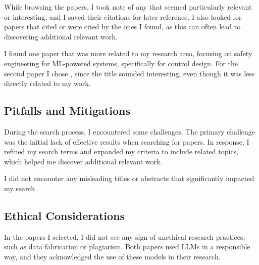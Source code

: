 \documentclass[a4paper,11pt]{article}
\begin{document}
While browsing the papers, I took note of any that seemed particularly relevant or interesting, and I saved their citations for later reference. I also looked for papers that cited or were cited by the ones I found, as this can often lead to discovering additional relevant work.

I found one paper \cite{Hong2025} that was more related to my research area, focusing on safety engineering for ML-powered systems, specifically for control design.
For the second paper I chose \cite{Ma2024}, since the title sounded interesting, even though it was less directly related to my work.

\subsection{Pitfalls and Mitigations}
During the search process, I encountered some challenges. The primary challenge was the initial lack of effective results when searching for papers. In response, I refined my search terms and expanded my criteria to include related topics, which helped me discover additional relevant work.

I did not encounter any misleading titles or abstracts that significantly impacted my search.

\subsection{Ethical Considerations}
In the papers I selected, I did not see any sign of unethical research practices, such as data fabrication or plagiarism. Both papers used LLMs in a responsible way, and they acknowledged the use of these models in their research.


\end{document}

